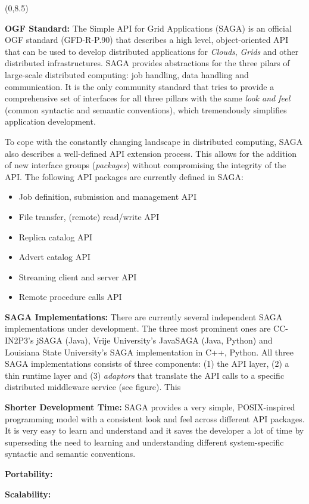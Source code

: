 \documentclass[a0b,portrait]{a0poster}
\def\LHead#1{\bigskip\bigskip\noindent{\huge\color{HeadColor} #1}\smallskip}
\begin{document}
\begin{textblock}{7}(0,8.5)

\LHead{What is SAGA ?}
\large

\textbf{\color{DarkBlue} OGF Standard: } The Simple API for Grid Applications
(SAGA) is an official OGF standard (GFD-R-P.90) that describes a high level,
object-oriented API that can be used to develop distributed applications for
\textit{Clouds}, \textit{Grids} and other distributed infrastructures.  SAGA
provides abstractions for the three pilars of large-scale distributed
computing: job handling, data handling and communication. It is the only
community standard that tries to provide a comprehensive set of interfaces for
all three pillars with the same \textit{look and feel} (common syntactic and
semantic conventions), which tremendously simplifies application development.

To cope with the constantly changing landscape in distributed computing, SAGA
also describes a well-defined API extension process. This allows for the
addition of new interface groups (\textit{packages}) without compromising the
integrity of the API. The following API packages are currently defined in
SAGA:

\begin{itemize} \item{Job definition, submission and management API}
\item{File transfer, (remote) read/write API} \item{Replica catalog API}
\item{Advert catalog API} \item{Streaming client and server API} \item{Remote
procedure calls API} \end{itemize}

\textbf{\color{DarkBlue} SAGA Implementations: } There are currently several
independent SAGA implementations under development. The three most prominent
ones are CC-IN2P3's jSAGA (Java), Vrije University's JavaSAGA (Java, Python)
and Louisiana State University's SAGA implementation in C++, Python. All three
SAGA implementations consists of three components: (1) the API layer, (2) a
thin runtime layer and (3) \textit{adaptors} that translate the API calls to a
specific distributed middleware service (see figure). This 

\LHead{Why Use SAGA ?}

\textbf{\color{DarkBlue} Shorter Development Time:} SAGA provides a very
simple, POSIX-inspired programming model with a consistent look and feel
across different API packages. It is very easy to learn and understand and
it saves the developer a lot of time by superseding the need to learning and
understanding different system-specific syntactic and semantic conventions.


\textbf{\color{DarkBlue} Portability:}

\textbf{\color{DarkBlue} Scalability:}

\large
\end{textblock}
\end{document}
